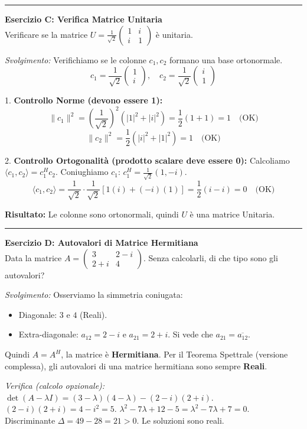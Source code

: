 \documentclass[10pt,a4paper]{article}
\begin{document}
\vspace{0.4cm}
\hrule
\vspace{0.4cm}

\textbf{Esercizio C: Verifica Matrice Unitaria}
\\ Verificare se la matrice $U = \frac{1}{\sqrt{2}} \begin{pmatrix} 1 & i \\ i & 1 \end{pmatrix}$ è unitaria.

\textit{Svolgimento:}
Verifichiamo se le colonne $c_1, c_2$ formano una base ortonormale.
\[ c_1 = \frac{1}{\sqrt{2}}\begin{pmatrix} 1 \\ i \end{pmatrix}, \quad c_2 = \frac{1}{\sqrt{2}}\begin{pmatrix} i \\ 1 \end{pmatrix} \]

1. \textbf{Controllo Norme (devono essere 1):}
\[ \|c_1\|^2 = \left(\frac{1}{\sqrt{2}}\right)^2 (|1|^2 + |i|^2) = \frac{1}{2}(1+1) = 1 \quad \text{(OK)} \]
\[ \|c_2\|^2 = \frac{1}{2}(|i|^2 + |1|^2) = 1 \quad \text{(OK)} \]

2. \textbf{Controllo Ortogonalità (prodotto scalare deve essere 0):}
Calcoliamo $\langle c_1, c_2 \rangle = c_1^H c_2$.
Coniughiamo $c_1$: $c_1^H = \frac{1}{\sqrt{2}} (1, -i)$.
\[ \langle c_1, c_2 \rangle = \frac{1}{\sqrt{2}} \cdot \frac{1}{\sqrt{2}} \left[ 1(i) + (-i)(1) \right] = \frac{1}{2} (i - i) = 0 \quad \text{(OK)} \]

\textbf{Risultato:} Le colonne sono ortonormali, quindi $U$ è una matrice Unitaria.

\vspace{0.4cm}
\hrule
\vspace{0.4cm}

\textbf{Esercizio D: Autovalori di Matrice Hermitiana}
\\ Data la matrice $A = \begin{pmatrix} 3 & 2-i \\ 2+i & 4 \end{pmatrix}$. Senza calcolarli, di che tipo sono gli autovalori?

\textit{Svolgimento:}
Osserviamo la simmetria coniugata:
\begin{itemize}
    \item Diagonale: $3$ e $4$ (Reali).
    \item Extra-diagonale: $a_{12} = 2-i$ e $a_{21} = 2+i$. Si vede che $a_{21} = \overline{a_{12}}$.
\end{itemize}
Quindi $A = A^H$, la matrice è \textbf{Hermitiana}.
Per il Teorema Spettrale (versione complessa), gli autovalori di una matrice hermitiana sono sempre \textbf{Reali}.

\textit{Verifica (calcolo opzionale):}
$\det(A-\lambda I) = (3-\lambda)(4-\lambda) - (2-i)(2+i)$.
$(2-i)(2+i) = 4 - i^2 = 5$.
$\lambda^2 - 7\lambda + 12 - 5 = \lambda^2 - 7\lambda + 7 = 0$.
Discriminante $\Delta = 49 - 28 = 21 > 0$. Le soluzioni sono reali.
\end{document}
